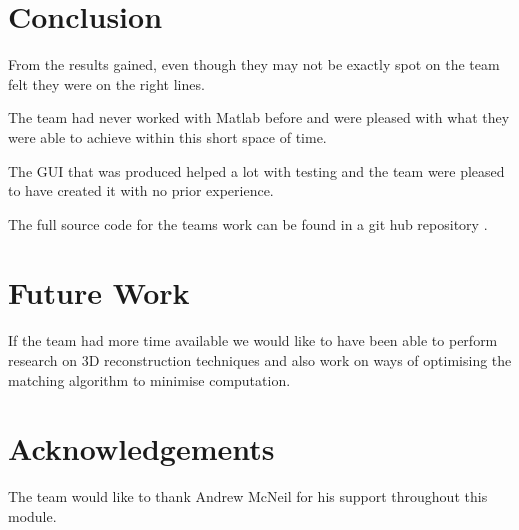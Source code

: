 \documentclass[twocolumn]{article}
\begin{document}
\section{Conclusion}
\vspace{-1ex}

From the results gained, even though they may not be exactly spot on the team felt they were on the right lines.

The team had never worked with Matlab before and were pleased with what they were able to achieve within this short space of time. 
 
The GUI that was produced helped a lot with testing and the team were pleased to have created it with no prior experience.   

The full source code for the teams work can be found in a git hub repository \cite{githublink}.

\section{Future Work} 
\vspace{-1ex}

If the team had more time available we would like to have been able to perform research on 3D reconstruction techniques and also work on ways of optimising the matching algorithm to minimise computation. 


\section*{Acknowledgements}
The team would like to thank Andrew McNeil for his support throughout this module.





\end{document}
